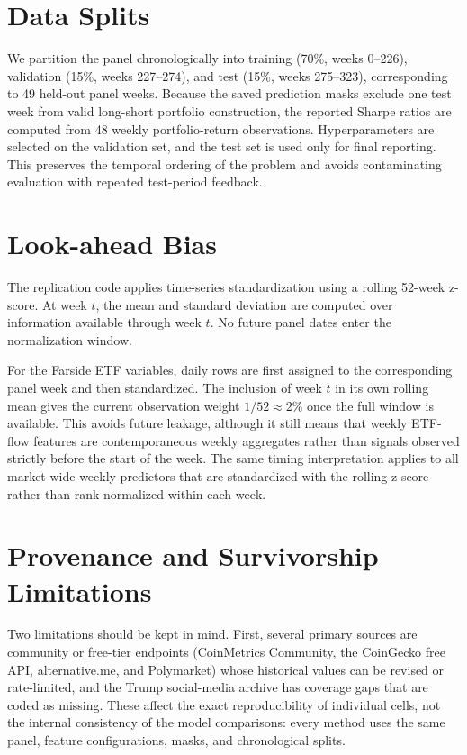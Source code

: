 \section{Data Splits}
\label{sec:data:splits}

We partition the panel chronologically into training (70\%, weeks 0--226),
validation (15\%, weeks 227--274), and test (15\%, weeks 275--323),
corresponding to 49 held-out panel weeks.
Because the saved prediction masks exclude one test week from valid
long-short portfolio construction, the reported Sharpe ratios are computed
from 48 weekly portfolio-return observations.
Hyperparameters are selected on the validation set, and the test set is used
only for final reporting.
This preserves the temporal ordering of the problem and avoids contaminating
evaluation with repeated test-period feedback.

\section{Look-ahead Bias}
\label{sec:data:lookahead}

The replication code applies time-series standardization using a rolling
52-week z-score.
At week $t$, the mean and standard deviation are computed over information
available through week $t$.
No future panel dates enter the normalization window.

For the Farside ETF variables, daily rows are first assigned to the
corresponding panel week and then standardized.
The inclusion of week $t$ in its own rolling mean gives the current
observation weight $1/52 \approx 2\%$ once the full window is available.
This avoids future leakage, although it still means that weekly ETF-flow
features are contemporaneous weekly aggregates rather than signals observed
strictly before the start of the week.
The same timing interpretation applies to all market-wide weekly predictors
that are standardized with the rolling z-score rather than rank-normalized
within each week.

\section{Provenance and Survivorship Limitations}
\label{sec:data:survival}

Two limitations should be kept in mind.
First, several primary sources are community or free-tier endpoints
(CoinMetrics Community, the CoinGecko free API, alternative.me, and Polymarket)
whose historical values can be revised or rate-limited, and the Trump
social-media archive has coverage gaps that are coded as missing.
These affect the exact reproducibility of individual cells, not the internal
consistency of the model comparisons: every method uses the same panel, feature
configurations, masks, and chronological splits.

